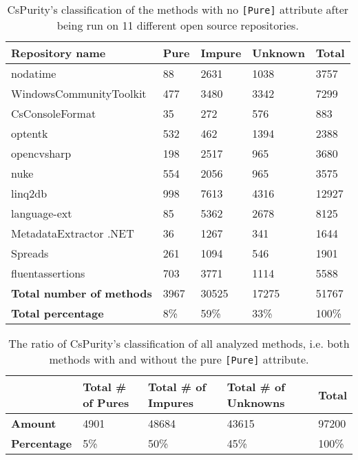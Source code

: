 \documentclass[a4paper,12pt]{article}
\begin{document}
\begin{table}[H]
  \small
  \caption{CsPurity's classification of the methods with no \texttt{[Pure]} attribute after being run on 11 different open source repositories.}
  \label{tab:results-non-pure-methods}
  \centering
  \begin{tabular}{|l|lll|l|}
    \hline
    \textbf{Repository name} & \textbf{Pure} & \textbf{Impure} & \textbf{Unknown} & \textbf{Total} \\
    \hline
    nodatime                        & 88   & 2631   & 1038    & 3757  \\
    WindowsCommunityToolkit         & 477  & 3480   & 3342    & 7299  \\
    CsConsoleFormat                 & 35   & 272    & 576     & 883   \\
    optentk                         & 532  & 462    & 1394    & 2388  \\
    opencvsharp                     & 198  & 2517   & 965     & 3680  \\
    nuke                            & 554  & 2056   & 965     & 3575  \\
    linq2db                         & 998  & 7613   & 4316    & 12927 \\
    language-ext                    & 85   & 5362   & 2678    & 8125  \\
    MetadataExtractor .NET          & 36   & 1267   & 341     & 1644  \\
    Spreads                         & 261  & 1094   & 546     & 1901  \\
    fluentassertions                & 703  & 3771   & 1114    & 5588  \\
    \hline
    \rowcolor{lightgray} \textbf{Total number of methods} & 3967 & 30525  & 17275 & \cellcolor{white} 51767 \\
    \rowcolor{lightgray} \textbf{Total percentage}        & 8\%  & 59\%   & 33\%  & \cellcolor{white} 100\% \\
    \hline
  \end{tabular}
\end{table}

\begin{table}[H]
  \small
  \caption{The ratio of CsPurity's classification of all analyzed methods, i.e. both methods with and without the pure \texttt{[Pure]} attribute.}
  \label{tab:results-summary}
  \centering
  \begin{tabular}{|l|lll|l|}
    \hline
                        & \textbf{Total \# of Pures} & \textbf{Total \# of Impures} & \textbf{Total \# of Unknowns} & \textbf{Total} \\
    \hline
    \textbf{Amount}     & 4901 & 48684  & 43615   & 97200 \\
    \textbf{Percentage} & 5\%  & 50\%   & 45\%    & 100\% \\
    \hline
  \end{tabular}
\end{table}
\end{document}
